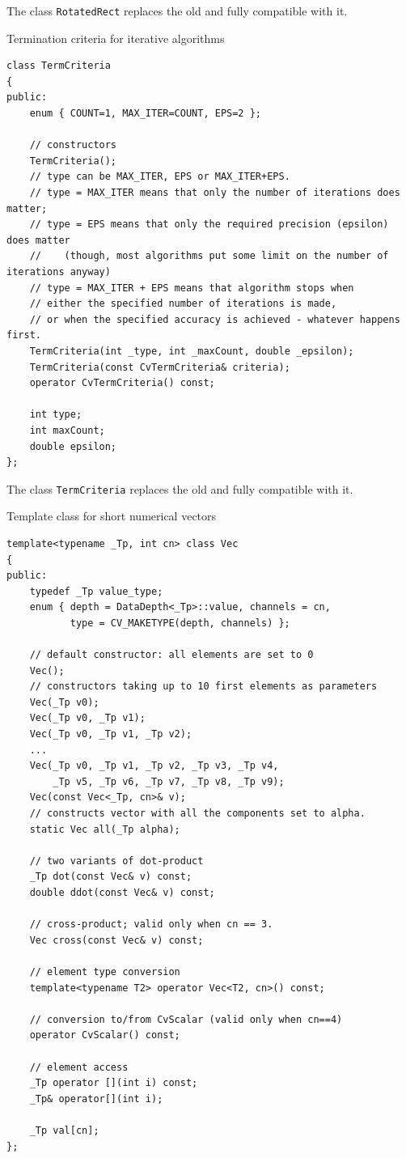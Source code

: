 The class \texttt{RotatedRect} replaces the old  and fully compatible with it.

\label{TermCriteria}

Termination criteria for iterative algorithms

\begin{lstlisting}
class TermCriteria
{
public:
    enum { COUNT=1, MAX_ITER=COUNT, EPS=2 };

    // constructors
    TermCriteria();
    // type can be MAX_ITER, EPS or MAX_ITER+EPS.
    // type = MAX_ITER means that only the number of iterations does matter;
    // type = EPS means that only the required precision (epsilon) does matter
    //    (though, most algorithms put some limit on the number of iterations anyway)
    // type = MAX_ITER + EPS means that algorithm stops when
    // either the specified number of iterations is made,
    // or when the specified accuracy is achieved - whatever happens first.
    TermCriteria(int _type, int _maxCount, double _epsilon);
    TermCriteria(const CvTermCriteria& criteria);
    operator CvTermCriteria() const;

    int type;
    int maxCount;
    double epsilon;
};
\end{lstlisting}

The class \texttt{TermCriteria} replaces the old  and fully compatible with it.


\label{Vec}
Template class for short numerical vectors

\begin{lstlisting}
template<typename _Tp, int cn> class Vec
{
public:
    typedef _Tp value_type;
    enum { depth = DataDepth<_Tp>::value, channels = cn,
           type = CV_MAKETYPE(depth, channels) };
    
    // default constructor: all elements are set to 0
    Vec();
    // constructors taking up to 10 first elements as parameters
    Vec(_Tp v0);
    Vec(_Tp v0, _Tp v1);
    Vec(_Tp v0, _Tp v1, _Tp v2);
    ...
    Vec(_Tp v0, _Tp v1, _Tp v2, _Tp v3, _Tp v4,
        _Tp v5, _Tp v6, _Tp v7, _Tp v8, _Tp v9);
    Vec(const Vec<_Tp, cn>& v);
    // constructs vector with all the components set to alpha.
    static Vec all(_Tp alpha);
    
    // two variants of dot-product
    _Tp dot(const Vec& v) const;
    double ddot(const Vec& v) const;
    
    // cross-product; valid only when cn == 3.
    Vec cross(const Vec& v) const;
    
    // element type conversion
    template<typename T2> operator Vec<T2, cn>() const;
    
    // conversion to/from CvScalar (valid only when cn==4)
    operator CvScalar() const;
    
    // element access
    _Tp operator [](int i) const;
    _Tp& operator[](int i);

    _Tp val[cn];
};
\end{lstlisting}

